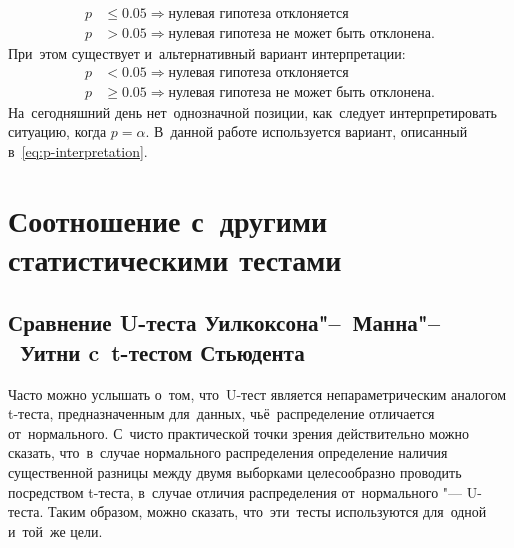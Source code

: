\documentclass[]{scrreprt}
\begin{document}
\begin{equation}\label{eq:p-interpretation}
	\begin{aligned}
	p &\leq 0.05 \Rightarrow \text{нулевая гипотеза отклоняется}\\
	p &> 0.05 \Rightarrow \text{нулевая гипотеза не может быть отклонена}.
	\end{aligned}
\end{equation}
%
При~этом существует и~альтернативный вариант интерпретации:
%
\begin{equation}\label{eq:p-interpretation-2}
\begin{aligned}
p &< 0.05 \Rightarrow \text{нулевая гипотеза отклоняется}\\
p &\geq 0.05 \Rightarrow \text{нулевая гипотеза не может быть отклонена}.
\end{aligned}
\end{equation}
На~сегодняшний день нет~однозначной позиции, как~следует интерпретировать ситуацию, когда $p = \alpha$. В~данной работе используется вариант, описанный в~\ref{eq:p-interpretation}.

\section{Соотношение с~другими статистическими тестами}
\subsection{Сравнение U-теста Уилкоксона"--~Манна"--~Уитни c~t-тестом Стьюдента}
Часто можно услышать о~том, что~U-тест является непараметрическим аналогом t-теста, предназначенным для~данных, чьё~распределение отличается от~нормального. С~чисто практической точки зрения действительно можно сказать, что~в~случае нормального распределения определение наличия существенной разницы между двумя выборками целесообразно проводить посредством t-теста, в~случае отличия распределения от~нормального "--- U-теста. Таким образом, можно сказать, что~эти~тесты используются для~одной и~той~же цели.
\end{document}
